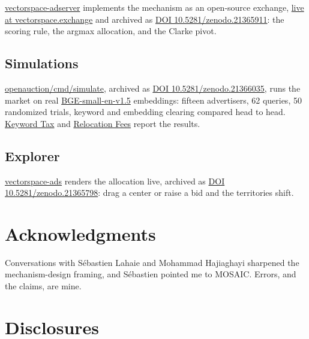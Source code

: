 \href{https://github.com/kimjune01/vectorspace-adserver}{vectorspace-adserver}
implements the mechanism as an open-source exchange,
\href{https://vectorspace.exchange/}{live at vectorspace.exchange} and
archived as \href{https://doi.org/10.5281/zenodo.21365911}{DOI
10.5281/zenodo.21365911}: the scoring rule, the argmax allocation, and
the Clarke pivot.

\subsection*{Simulations}\label{simulations}

\href{https://github.com/kimjune01/openauction/tree/v3.4/cmd/simulate}{openauction/cmd/simulate},
archived as \href{https://doi.org/10.5281/zenodo.21366035}{DOI
10.5281/zenodo.21366035}, runs the market on real
\href{https://huggingface.co/BAAI/bge-small-en-v1.5}{BGE-small-en-v1.5}
embeddings: fifteen advertisers, 62 queries, 50 randomized trials,
keyword and embedding clearing compared head to head.
\href{https://june.kim/keyword-tax}{Keyword Tax} and
\href{https://june.kim/relocation-fees}{Relocation Fees} report the
results.

\subsection*{Explorer}\label{explorer}

\href{https://june.kim/vectorspace-ads/}{vectorspace-ads} renders the
allocation live, archived as
\href{https://doi.org/10.5281/zenodo.21365798}{DOI
10.5281/zenodo.21365798}: drag a center or raise a bid and the
territories shift.

\section*{Acknowledgments}\label{acknowledgments}

Conversations with Sébastien Lahaie and Mohammad Hajiaghayi sharpened
the mechanism-design framing, and Sébastien pointed me to MOSAIC.
Errors, and the claims, are mine.

\section*{Disclosures}\label{disclosures}


